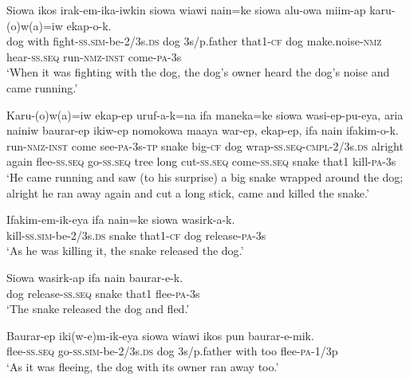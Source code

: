\ea\label{ex:a:x7}
\gll  Siowa  ikos  irak-em-ika-iwkin  siowa  wiawi  nain=ke    siowa  alu-owa  miim-ap  karu-(o)w(a)=iw  ekap-o-k. \\
dog  with  fight-\textsc{ss}.\textsc{sim}-be-2/3s.\textsc{ds}  dog  3s/p.father  that1-\textsc{cf} dog  make.noise-\textsc{nmz}  hear-\textsc{ss.seq}  run-\textsc{nmz}-\textsc{inst}  come-\textsc{pa}-3s \\


\glt ‘When it was fighting with the dog, the dog’s owner heard the dog’s noise and came running.’ \\
\z


\ea\label{ex:a:x8}
\gll  Karu-(o)w(a)=iw  ekap-ep  uruf-a-k=na  ifa  maneka=ke  siowa  wasi-ep-pu-eya,  aria  nainiw  baurar-ep  ikiw-ep  nomokowa            maaya  war-ep,  ekap-ep,  ifa  nain  ifakim-o-k. \\
run-\textsc{nmz}-\textsc{inst}  come  see-\textsc{pa}-3s-\textsc{tp}  snake  big-\textsc{cf}  dog                wrap-\textsc{ss.seq}-\textsc{cmpl}-2/3s.\textsc{ds}  alright  again  flee-\textsc{ss.seq}  go-\textsc{ss.seq}  tree long  cut-\textsc{ss.seq}  come-\textsc{ss.seq}  snake  that1  kill-\textsc{pa}-3s \\




\glt ‘He came running and saw (to his surprise) a big snake wrapped around the dog; alright he ran away again and cut a long stick, came and killed the snake.’ \\
\z


\ea\label{ex:a:x9}
\gll  Ifakim-em-ik-eya  ifa  nain=ke  siowa  wasirk-a-k. \\
kill-\textsc{ss}.\textsc{sim}-be-2/3s.\textsc{ds}  snake  that1-\textsc{cf}  dog  release-\textsc{pa}-3s \\
\glt ‘As he was killing it, the snake released the dog.’ \\
\z


\ea\label{ex:a:x10}
\gll  Siowa  wasirk-ap  ifa  nain  baurar-e-k. \\
dog  release-\textsc{ss.seq}  snake  that1  flee-\textsc{pa}-3s \\
\glt ‘The snake released the dog and fled.’ \\
\z


\ea\label{ex:a:x11}
\gll  Baurar-ep  iki(w-e)m-ik-eya  siowa  wiawi  ikos  pun  baurar-e-mik. \\
flee-\textsc{ss.seq}  go-\textsc{ss}.\textsc{sim}-be-2/3s.\textsc{ds}  dog  3s/p.father  with  too  flee-\textsc{pa}-1/3p \\
\glt ‘As it was fleeing, the dog with its owner ran away too.’ \\
\z


